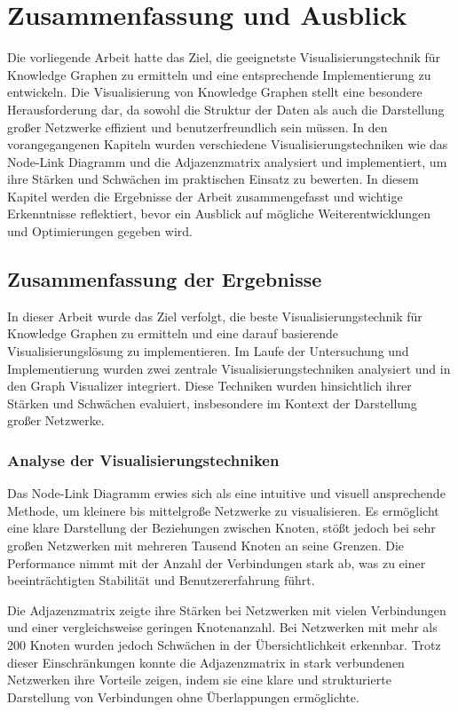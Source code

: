 
\chapter{Zusammenfassung und Ausblick}

Die vorliegende Arbeit hatte das Ziel, die geeignetste Visualisierungstechnik für Knowledge Graphen zu ermitteln und eine entsprechende Implementierung zu entwickeln. Die Visualisierung von Knowledge Graphen stellt eine besondere Herausforderung dar, da sowohl die Struktur der Daten als auch die Darstellung großer Netzwerke effizient und benutzerfreundlich sein müssen. In den vorangegangenen Kapiteln wurden verschiedene Visualisierungstechniken wie das Node-Link Diagramm und die Adjazenzmatrix analysiert und implementiert, um ihre Stärken und Schwächen im praktischen Einsatz zu bewerten. In diesem Kapitel werden die Ergebnisse der Arbeit zusammengefasst und wichtige Erkenntnisse reflektiert, bevor ein Ausblick auf mögliche Weiterentwicklungen und Optimierungen gegeben wird.

\section{Zusammenfassung der Ergebnisse}

In dieser Arbeit wurde das Ziel verfolgt, die beste Visualisierungstechnik für Knowledge Graphen zu ermitteln und eine darauf basierende Visualisierungslösung zu implementieren. Im Laufe der Untersuchung und Implementierung wurden zwei zentrale Visualisierungstechniken analysiert und in den Graph Visualizer integriert. Diese Techniken wurden hinsichtlich ihrer Stärken und Schwächen evaluiert, insbesondere im Kontext der Darstellung großer Netzwerke.

\subsection{Analyse der Visualisierungstechniken}

Das Node-Link Diagramm erwies sich als eine intuitive und visuell ansprechende Methode, um kleinere bis mittelgroße Netzwerke zu visualisieren. Es ermöglicht eine klare Darstellung der Beziehungen zwischen Knoten, stößt jedoch bei sehr großen Netzwerken mit mehreren Tausend Knoten an seine Grenzen. Die Performance nimmt mit der Anzahl der Verbindungen stark ab, was zu einer beeinträchtigten Stabilität und Benutzererfahrung führt.

Die Adjazenzmatrix zeigte ihre Stärken bei Netzwerken mit vielen Verbindungen und einer vergleichsweise geringen Knotenanzahl. Bei Netzwerken mit mehr als 200 Knoten wurden jedoch Schwächen in der Übersichtlichkeit erkennbar. Trotz dieser Einschränkungen konnte die Adjazenzmatrix in stark verbundenen Netzwerken ihre Vorteile zeigen, indem sie eine klare und strukturierte Darstellung von Verbindungen ohne Überlappungen ermöglichte.

